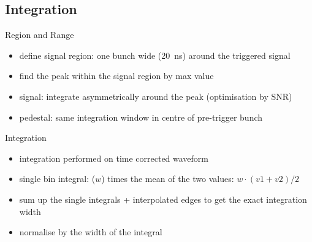 \subsection{Integration}
\begin{frame}{Region and Range}

	
	
	\begin{itemize}\itemfill
		\item<2-> define signal region: one bunch wide (\SI{20}{\nano\second}) around the triggered signal
		\item<4-> find the peak within the signal region by max value
		\item<5-> signal: integrate asymmetrically around the peak (optimisation by SNR)
		\item<6-> pedestal: same integration window in centre of pre-trigger bunch
	\end{itemize}
\end{frame}
\begin{frame}{Integration}
	
	
	\begin{itemize}\itemfill
		\item integration performed on time corrected waveform 
		\item single bin integral: ($w$) times the mean of the two values: $w\cdot(v1 + v2) / 2$
		\item sum up the single integrals + interpolated edges to get the exact integration width
		\item normalise by the width of the integral
	\end{itemize}
 
\end{frame}

